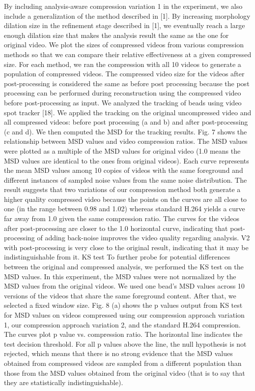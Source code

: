 By including analysis-aware compression variation 1 in the experiment, we also include a generalization of the method described in [1]. By increasing morphology dilation size in the refinement stage described in [1], we eventually reach a large enough dilation size that makes the analysis result the same as the one for original video.
We plot the sizes of compressed videos from various compression methods so that we can compare their relative effectiveness at a given compressed size. For each method, we ran the compression with all 10 videos to generate a population of compressed videos. The compressed video size for the videos after post-processing is considered the same as before post processing because the post processing can be performed during reconstruction using the compressed video before post-processing as input.
We analyzed the tracking of beads using video spot tracker [18]. We applied the tracking on the original uncompressed video and all compressed videos: before post processing (a and b) and after post-processing (c and d).  We then computed the MSD for the tracking results. Fig. 7 shows the relationship between MSD values and video compression ratios. The MSD values were plotted as a multiple of the MSD values for original video (1.0 means the MSD values are identical to the ones from original videos). Each curve represents the mean MSD values among 10 copies of videos with the same foreground and different instances of sampled noise values from the same noise distribution.
The result suggests that two variations of our compression method both generate a higher quality compressed video because the points on the curves are all close to one (in the range between 0.98 and 1.02) whereas standard H.264 yields a curve far away from 1.0 given the same compression ratio. The curves for the videos after post-processing are closer to the 1.0 horizontal curve, indicating that post-processing of adding back-noise improves the video quality regarding analysis. V2 with post-processing is very close to the original result, indicating that it may be indistinguishable from it.
KS test
To further probe for potential differences between the original and compressed analysis, we performed the KS test on the MSD values. In this experiment, the MSD values were not normalized by the MSD values from the original videos. We used one bead’s MSD values across 10 versions of the videos that share the same foreground content. After that, we selected a fixed window size. Fig. 8 (a) shows the p values output from KS test for MSD values on videos compressed using our compression approach variation 1, our compression approach variation 2, and the standard H.264 compression. The curves plot p value vs. compression ratio. The horizontal line indicates the test decision threshold. For all p values above the line, the null hypothesis is not rejected, which means that there is no strong evidence that the MSD values obtained from compressed videos are sampled from a different population than those from the MSD values obtained from the original video (that is to say that they are statistically indistinguishable).

